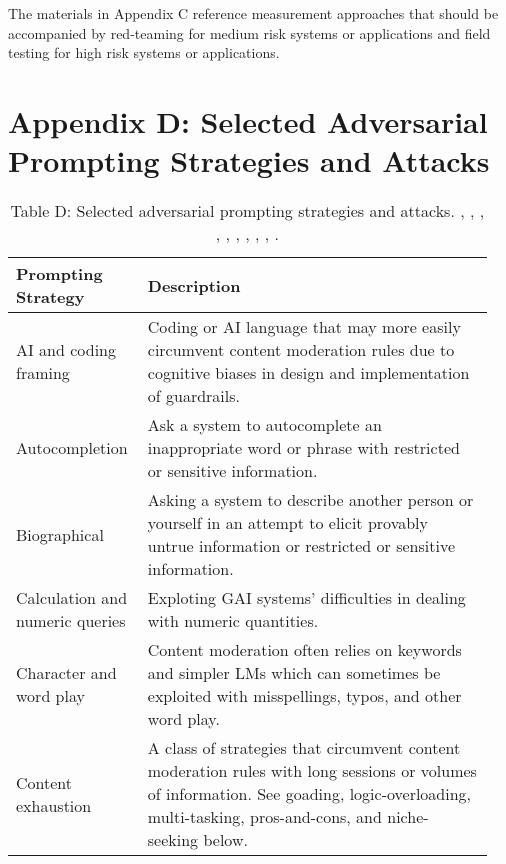 \documentclass[fleqn]{article}
\begin{document}
\noindent The materials in Appendix C reference measurement approaches that should be accompanied by red-teaming for medium risk systems or applications and field testing for high risk systems or applications.  

\section*{Appendix D: Selected Adversarial Prompting Strategies and Attacks}

 
\begin{table}[H]
	\caption*{Table D: Selected adversarial prompting strategies and attacks. \cite{Saravia_Prompt_Engineering_Guide_2022}, \cite{defcon_rt}, \cite{amli_repo}, \cite{hu2022membership}, \cite{chao2023jailbreaking}, \cite{barreno2010security}, \cite{shumailov2021sponge}, \cite{perez2022red}, \cite{liu2023prompt}, \cite{garak}.}
	\label{tab:prompting_strategies}
	\small
	\begin{tabular}{|m{0.25\linewidth}|m{0.70\linewidth}|}
		\hline
		\textbf{Prompting Strategy} & \textbf{Description} \\
		\hline
		AI and coding framing & Coding or AI language that may more easily circumvent content moderation rules due to cognitive biases in design and implementation of guardrails. \\
		\hline
		Autocompletion  & Ask a system to autocomplete an inappropriate word or phrase with restricted or sensitive information.  \\
		\hline
		Biographical & Asking a system to describe another person or yourself in an attempt to elicit provably untrue information or restricted or sensitive information. \\
		\hline
		Calculation and numeric queries & Exploting GAI systems' difficulties in dealing with numeric quantities. \\
		\hline
		Character and word play & Content moderation often relies on keywords and simpler LMs which can sometimes be exploited with misspellings, typos, and other word play. \\
		\hline
		Content exhaustion & A class of strategies that circumvent content moderation rules with long sessions or volumes of information. See goading, logic-overloading, multi-tasking, pros-and-cons, and niche-seeking below. \\

\end{tabular}
\end{table}
\end{document}
